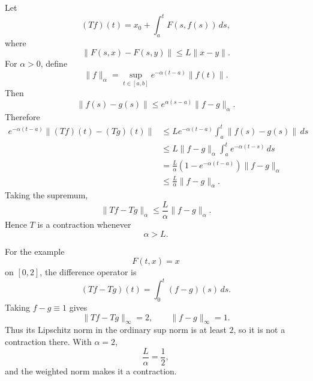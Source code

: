 \begin{solution}
Let
\[
(Tf)(t)
=
x_0+\int_a^tF(s,f(s))\,ds,
\]
where
\[
\|F(s,x)-F(s,y)\|
\le
L\|x-y\|.
\]
For \(\alpha>0\), define
\[
\|f\|_\alpha
=
\sup_{t\in[a,b]}
e^{-\alpha(t-a)}\|f(t)\|.
\]
Then
\[
\|f(s)-g(s)\|
\le
e^{\alpha(s-a)}
\|f-g\|_\alpha.
\]
Therefore
\[
\begin{aligned}
e^{-\alpha(t-a)}
\|(Tf)(t)-(Tg)(t)\|
&\le
Le^{-\alpha(t-a)}
\int_a^t
\|f(s)-g(s)\|\,ds\\
&\le
L\|f-g\|_\alpha
\int_a^t
e^{-\alpha(t-s)}\,ds\\
&=
\frac{L}{\alpha}
\left(
1-e^{-\alpha(t-a)}
\right)
\|f-g\|_\alpha\\
&\le
\frac{L}{\alpha}\|f-g\|_\alpha.
\end{aligned}
\]
Taking the supremum,
\[
\boxed{
\|Tf-Tg\|_\alpha
\le
\frac{L}{\alpha}\|f-g\|_\alpha.
}
\]
Hence \(T\) is a contraction whenever
\[
\boxed{\alpha>L.}
\]

For the example
\[
F(t,x)=x
\]
on \([0,2]\), the difference operator is
\[
(Tf-Tg)(t)
=
\int_0^t(f-g)(s)\,ds.
\]
Taking \(f-g\equiv1\) gives
\[
\|Tf-Tg\|_\infty=2,
\qquad
\|f-g\|_\infty=1.
\]
Thus its Lipschitz norm in the ordinary sup norm is at least \(2\), so it is not a
contraction there. With \(\alpha=2\),
\[
\frac{L}{\alpha}=\frac12,
\]
and the weighted norm makes it a contraction.
\end{solution}


